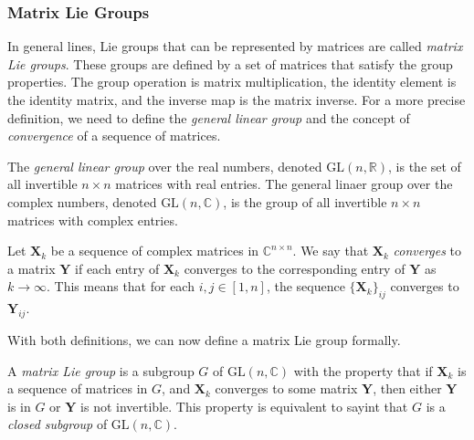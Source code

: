 \subsubsection{Matrix Lie Groups}
In general lines, Lie groups that can be represented by matrices are called \emph{matrix Lie groups}. These groups are defined by a set of matrices that satisfy the group properties. The group operation is matrix multiplication, the identity element is the identity matrix, and the inverse map is the matrix inverse. For a more precise definition, we need to define the \emph{general linear group} and the concept of \emph{convergence} of a sequence of matrices.
\begin{definition}
    The \emph{general linear group} over the real numbers, denoted $\text{GL}(n, \mathbb{R})$, is the set of all invertible $n\times n$ matrices with real entries. The general linaer group over the complex numbers, denoted $\text{GL}(n, \mathbb{C})$, is the group of all invertible $n\times n$ matrices with complex entries.
\end{definition}
\begin{definition}
    Let $\mathbf{X}_k$ be a sequence of complex matrices in $\mathbb{C}^{n\times n}$. We say that $\mathbf{X}_k$ \emph{converges} to a matrix $\mathbf{Y}$ if each entry of $\mathbf{X}_k$ converges to the corresponding entry of $\mathbf{Y}$ as $k\to\infty$. This means that for each $i,j\in[1,n]$, the sequence $\{\mathbf{X}_k\}_{ij}$ converges to $\mathbf{Y}_{ij}$.
\end{definition}
With both definitions, we can now define a matrix Lie group formally.
\begin{definition}
    A \emph{matrix Lie group} is a subgroup $G$ of $\text{GL}(n, \mathbb{C})$ with the property that if $\mathbf{X}_k$ is a sequence of matrices in $G$, and $\mathbf{X}_k$ converges to some matrix $\mathbf{Y}$, then either $\mathbf{Y}$ is in $G$ or $\mathbf{Y}$ is not invertible. This property is equivalent to sayint that $G$ is a \emph{closed subgroup} of $\text{GL}(n, \mathbb{C})$.
\end{definition}

